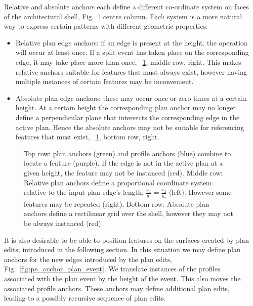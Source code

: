 Relative and absolute anchors each define a different co-ordinate system on faces of the architectural shell, Fig.~\ref{fig:anchor} centre column. Each system is a more natural way to express certain patterns with different geometric properties:
\begin{itemize}
\item{Relative plan edge anchors: if an edge is present at the height, the operation will occur at least once. If a split event has taken place on the corresponding edge, it may take place more than once, ~\ref{fig:anchor}, middle row, right. This makes relative anchors suitable for features that must always exist, however having multiple instances of certain features may be inconvenient.}
\item{Absolute plan edge anchors: these may occur once or zero times at a certain height. At a certain height the corresponding plan anchor may no longer define a perpendicular plane that intersects the corresponding edge in the active plan. Hence the absolute anchors may not be suitable for referencing features that must exist, ~\ref{fig:anchor}, bottom row, right.}
\end{itemize}

\begin{figure}
  \centering
  \def\svgwidth{1.0\columnwidth}
  
  \caption[Anchors defining positions]{\label{fig:anchor}Top row: plan anchors (green) and profile anchors (blue) combine to locate a feature (purple). If the edge is not in the active plan at a given height, the feature may not be instanced (red). 
Middle row: Relative plan anchors define a proportional coordinate system relative to the input plan edge's length, $\frac{x_1}{y_1}  = \frac{x_2}{y_2}$  (left). However some features may be repeated (right). Bottom row: Absolute plan anchors define a rectilinear grid over the shell, however they may not be always instanced (red).}
\end{figure}

It is also desirable to be able to position features on the surfaces created by plan edits, introduced in the following section. In this situation we may define plan anchors for the new edges introduced by the plan edits, Fig.~\ref{fig:pe_anchor_plan_event}. We translate instances of the profiles associated with the plan event by the height of the event. This also moves the associated profile anchors. These anchors may define additional plan edits, leading to a possibly recursive sequence of plan edits. 

